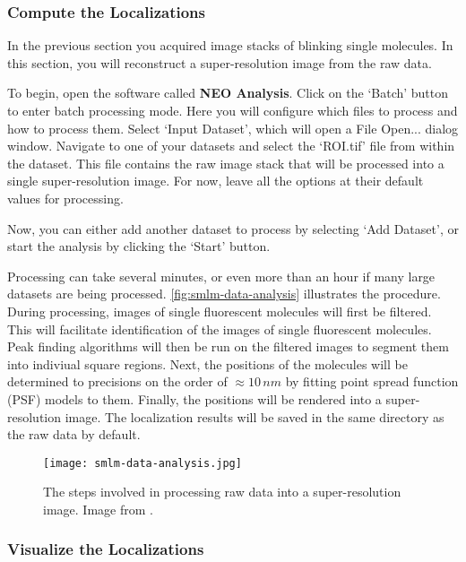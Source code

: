 \documentclass[10pt,a4paper,oneside]{book}
\begin{document}
\subsubsection{Compute the Localizations}

In the previous section you acquired image stacks of blinking single molecules. In this section, you will reconstruct a super-resolution image from the raw data.

To begin, open the software called \textbf{NEO Analysis}. Click on the `Batch' button to enter batch processing mode. Here you will configure which files to process and how to process them. Select `Input Dataset', which will open a File Open... dialog window. Navigate to one of your datasets and select the `ROI.tif' file from within the dataset. This file contains the raw image stack that will be processed into a single super-resolution image. For now, leave all the options at their default values for processing.

Now, you can either add another dataset to process by selecting `Add Dataset', or start the analysis by clicking the `Start' button.

Processing can take several minutes, or even more than an hour if many large datasets are being processed. \autoref{fig:smlm-data-analysis} illustrates the procedure. During processing, images of single fluorescent molecules will first be filtered. This will facilitate identification of the images of single fluorescent molecules. Peak finding algorithms will then be run on the filtered images to segment them into indiviual square regions. Next, the positions of the molecules will be determined to precisions on the order of $\approx 10 \, nm$ by fitting point spread function (PSF) models to them. Finally, the positions will be rendered into a super-resolution image. The localization results will be saved in the same directory as the raw data by default.

\begin{figure}
    \centering
    \texttt{[image: smlm-data-analysis.jpg]}
    \caption{The steps involved in processing raw data into a super-resolution image. Image from \cite{martens-frontiersinbioinformatics-2022}.}
    \label{fig:smlm-data-analysis}
\end{figure}

\subsubsection{Visualize the Localizations}
\end{document}
